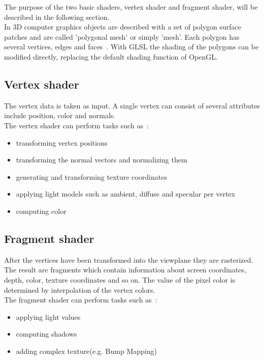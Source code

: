 The purpose of the two basic shaders, vertex shader and fragment shader, will be described in the following section.\\
\newline
In 3D computer graphics objects are described with a set of polygon surface patches and are called 'polygonal mesh' or simply 'mesh'. Each polygon has several vertices, edges and faces~\cite{book:computerGraphicsHearn}. With GLSL the shading of the polygons can be modified directly, replacing the default shading function of OpenGL.

\subsection{Vertex shader}
The vertex data is taken as input. A single vertex can consist of several attributes include position, color and normals.\\
The vertex shader can perform tasks such as~\cite{book:computerGraphicsHill}: %
\begin{itemize}
	\item transforming vertex positions
	\item transforming the normal vectors and normalizing them
	\item generating and transforming texture coordinates
	\item applying light models such as ambient, diffuse and specular per vertex
	\item computing color
\end{itemize}

\subsection{Fragment shader}	
After the vertices have been transformed into the viewplane they are rasterized. The result are fragments which contain information about screen coordinates, depth, color, texture coordinates and so on. The value of the pixel color is determined by interpolation of the vertex colors.\\
The fragment shader can perform tasks such as~\cite{book:computerGraphicsHill}: %
\begin{itemize}
	\item applying light values
	\item computing shadows
	\item adding complex texture(e.g. Bump Mapping)
\end{itemize}




